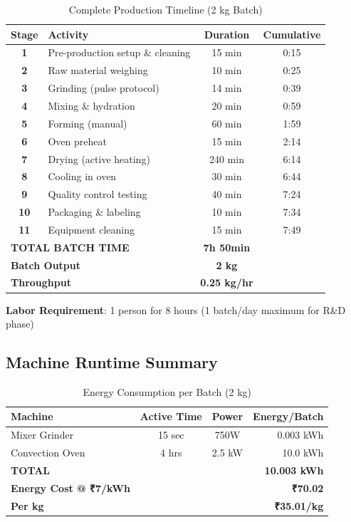 \documentclass[12pt,a4paper]{article}
\begin{document}
\begin{table}[h]
\centering
\small
\begin{tabular}{clcc}
\toprule
\textbf{Stage} & \textbf{Activity} & \textbf{Duration} & \textbf{Cumulative} \\
\midrule
\textbf{1} & Pre-production setup \& cleaning & 15 min & 0:15 \\
\textbf{2} & Raw material weighing & 10 min & 0:25 \\
\textbf{3} & Grinding (pulse protocol) & 14 min & 0:39 \\
\textbf{4} & Mixing \& hydration & 20 min & 0:59 \\
\textbf{5} & Forming (manual) & 60 min & 1:59 \\
\textbf{6} & Oven preheat & 15 min & 2:14 \\
\textbf{7} & Drying (active heating) & 240 min & 6:14 \\
\textbf{8} & Cooling in oven & 30 min & 6:44 \\
\textbf{9} & Quality control testing & 40 min & 7:24 \\
\textbf{10} & Packaging \& labeling & 10 min & 7:34 \\
\textbf{11} & Equipment cleaning & 15 min & 7:49 \\
\midrule
\multicolumn{2}{l}{\textbf{TOTAL BATCH TIME}} & \textbf{7h 50min} & \\
\multicolumn{2}{l}{\textbf{Batch Output}} & \textbf{2 kg} & \\
\multicolumn{2}{l}{\textbf{Throughput}} & \textbf{0.25 kg/hr} & \\
\bottomrule
\end{tabular}
\caption{Complete Production Timeline (2 kg Batch)}
\end{table}

\textbf{Labor Requirement}: 1 person for 8 hours (1 batch/day maximum for R\&D phase)

\subsection{Machine Runtime Summary}

\begin{table}[h]
\centering
\begin{tabular}{lccr}
\toprule
\textbf{Machine} & \textbf{Active Time} & \textbf{Power} & \textbf{Energy/Batch} \\
\midrule
Mixer Grinder & 15 sec & 750W & 0.003 kWh \\
Convection Oven & 4 hrs & 2.5 kW & 10.0 kWh \\
\midrule
\textbf{TOTAL} & & & \textbf{10.003 kWh} \\
\textbf{Energy Cost @ ₹7/kWh} & & & \textbf{₹70.02} \\
\textbf{Per kg} & & & \textbf{₹35.01/kg} \\
\bottomrule
\end{tabular}
\caption{Energy Consumption per Batch (2 kg)}
\end{table}
\end{document}
